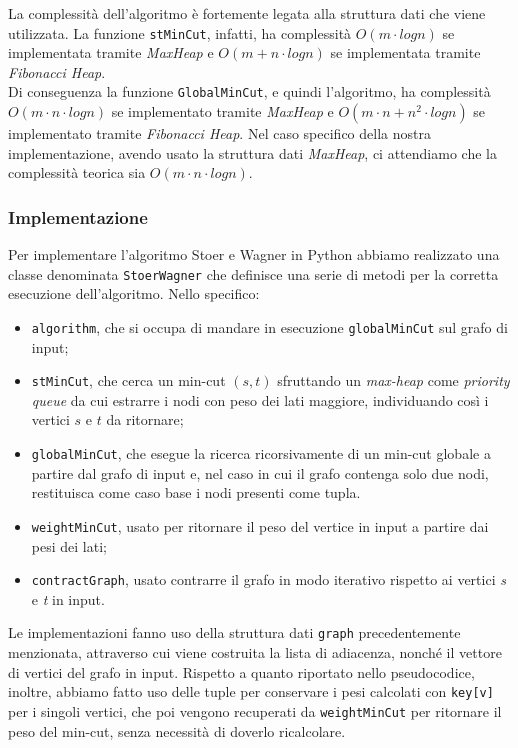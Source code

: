 La complessità dell'algoritmo è fortemente legata alla struttura dati che viene utilizzata. La funzione \texttt{stMinCut}, infatti, ha complessità $O(m\cdot logn)$ se implementata tramite \textit{MaxHeap} e $O(m+n \cdot logn)$ se implementata tramite \textit{Fibonacci Heap}. \\
Di conseguenza la funzione \texttt{GlobalMinCut}, e quindi l'algoritmo, ha complessità $O(m\cdot n\cdot logn)$ se implementato tramite \textit{MaxHeap} e $O(m\cdot n+n^2 \cdot logn)$ se implementato tramite \textit{Fibonacci Heap}. Nel caso specifico della nostra implementazione, avendo usato la struttura dati \textit{MaxHeap}, ci attendiamo che la complessità teorica sia $O(m\cdot n \cdot logn)$.

\subsubsection{Implementazione}

Per implementare l'algoritmo Stoer e Wagner in Python abbiamo realizzato una classe denominata \texttt{StoerWagner} che definisce una serie di metodi per la corretta esecuzione dell'algoritmo.
Nello specifico: 

\begin{itemize}
    \item \texttt{algorithm}, che si occupa di mandare in esecuzione \texttt{globalMinCut} sul grafo di input;
    \item \texttt{stMinCut}, che cerca un min-cut \((s,t)\) sfruttando un \textit{max-heap} come \textit{priority queue} da cui estrarre i nodi con peso dei lati maggiore, individuando così i vertici $s$ e $t$ da ritornare;
    \item \texttt{globalMinCut}, che esegue la ricerca ricorsivamente di un min-cut globale a partire dal grafo di input e, nel caso in cui il grafo contenga solo due nodi, restituisca come caso base i nodi presenti come tupla.
    \item \texttt{weightMinCut}, usato per ritornare il peso del vertice in input a partire dai pesi dei lati;
    \item \texttt{contractGraph}, usato contrarre il grafo in modo iterativo rispetto ai vertici \textit{s} e \textit{t} in input. 
\end{itemize}

Le implementazioni fanno uso della struttura dati \texttt{graph} precedentemente menzionata, attraverso cui viene costruita la lista di adiacenza, nonché il vettore di vertici del grafo in input. Rispetto a quanto riportato nello pseudocodice, inoltre, abbiamo fatto uso delle tuple per conservare i pesi calcolati con \texttt{key[v]} per i singoli vertici, che poi vengono recuperati da \texttt{weightMinCut} per ritornare il peso del min-cut, senza necessità di doverlo ricalcolare.

